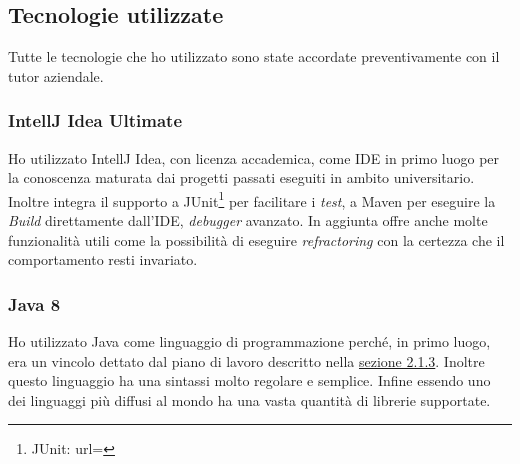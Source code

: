 \subsection{Tecnologie utilizzate}
Tutte le tecnologie che ho utilizzato sono state accordate preventivamente con il tutor aziendale.
\subsubsection{IntellJ Idea Ultimate}
Ho utilizzato IntellJ Idea, con licenza accademica, come \gls{IDE} in primo luogo per la conoscenza maturata dai progetti passati eseguiti in ambito universitario. Inoltre integra il supporto a JUnit\footnote{JUnit: url= } per facilitare i \textit{test}, a Maven per eseguire la \textit{Build} direttamente dall'\gls{IDE}, \textit{debugger} avanzato. In aggiunta offre anche molte funzionalità utili come la possibilità di eseguire \textit{\gls{refractoring}} con la certezza che il comportamento resti invariato.

\subsubsection{Java 8}
Ho utilizzato Java come linguaggio di programmazione perché, in primo luogo, era un vincolo dettato dal piano di lavoro descritto nella \hyperlink{sec:pianodl}{sezione 2.1.3}. Inoltre questo linguaggio ha una sintassi molto regolare e semplice. Infine essendo uno dei linguaggi più diffusi al mondo ha una vasta quantità di librerie supportate.
